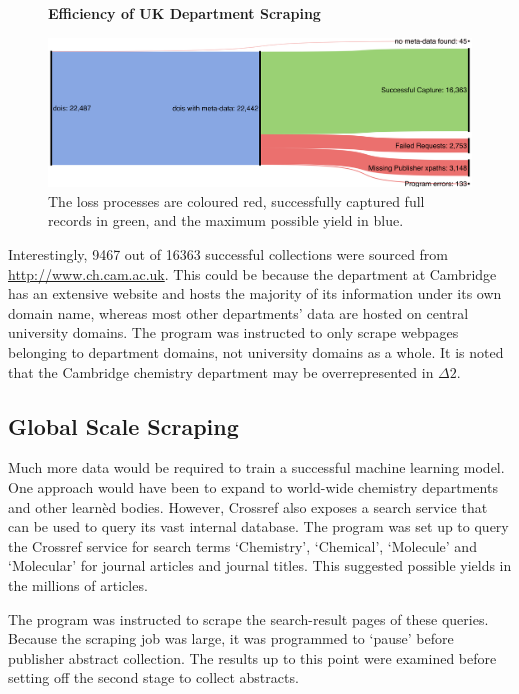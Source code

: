 \begin{figure}[H]
    \centering
    \textbf{Efficiency of UK Department Scraping}\par\medskip
    \includegraphics[width=\textwidth]{Data_Acquisition/uk_sankey.png}
    \caption[Efficiency of UK Department Scraping]{The loss processes are coloured red, successfully captured full records in green, and the maximum possible yield in blue.}
     \label{fig:UKSANK}
\end{figure}

Interestingly, 9467 out of 16363 successful collections were sourced from \url{http://www.ch.cam.ac.uk}. This could be because the department at Cambridge has an extensive website and  hosts the majority of its information under its own domain name, whereas most other departments' data are hosted on central university domains. The program was instructed to only scrape webpages belonging to department domains, not university domains as a whole. It is noted that the Cambridge chemistry department may be overrepresented in $\Delta2$.

\subsection{Global Scale Scraping}
\label{sec:CROSSREFSCRAPE}
Much more data would be required to train a successful machine learning model. One approach would have been to expand to world-wide chemistry departments and other learn\`{e}d bodies. However, Crossref also exposes a search service that can be used to query its vast internal database. The program was set up to query the Crossref service for search terms `Chemistry', `Chemical', `Molecule' and `Molecular' for journal articles and journal titles. This suggested possible yields in the millions of articles. 

The program was instructed to scrape the search-result pages of these queries. Because the scraping job was large, it was programmed to `pause' before publisher abstract collection. The results up to this point were examined before setting off the second stage to collect abstracts.

